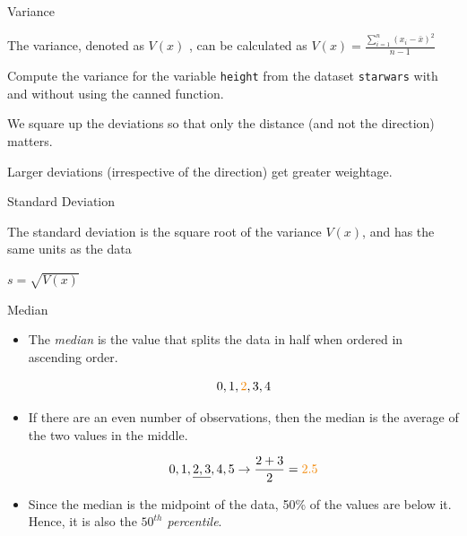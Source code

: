 \documentclass[notes,11pt, aspectratio=169]{beamer}
\newenvironment{wideitemize}{\itemize\addtolength{\itemsep}{10pt}}{\enditemize}
\newcommand{\hl}[1]{\textit{\textcolor{hlblue}{#1}}}
\begin{document}
\begin{frame}{Variance}
\begin{center}
\colorbox{textboxgreen}{
 The variance, denoted as $V(x)$ , can be calculated as 
$ V(x) = \frac{\sum_{i = 1}^n (x_i - \bar{x})^2}{n - 1}$  }

\vspace{5mm}

\pause

\colorbox{textboxred!75}{\parbox{0.75\textwidth}{
Compute the variance for the variable \texttt{height} from the dataset \texttt{starwars} with
 and without using the canned function.}}
\end{center}


\pause
\vspace{8mm}

\begin{wideitemize}
\item We square up the deviations so that only the distance (and not the direction) matters.
\item Larger deviations (irrespective of the direction) get greater weightage. 
\end{wideitemize}
\end{frame}

\begin{frame}{Standard Deviation}

\begin{center}
\colorbox{textboxgreen}{\parbox{0.85\textwidth}{
The standard deviation is the square root of the variance $V(x)$, and has the same units as the data

 \vspace{1mm}
 
 $ s = \sqrt{V(x)}$ }}
\end{center}

\end{frame}


\begin{frame}{Median}

\begin{itemize}

\item The \hl{median} is the value that splits the data in half when ordered in ascending order.

\[ 0,1,\textcolor{tangerine}{2},3,4 \]

\item If there are an even number of observations, then the median is the average of the two values in the middle.

\[ 0,1,\underline{2,3},4,5 \rightarrow \frac{2 + 3}{2} = \textcolor{tangerine}{2.5} \]

\item Since the median is the midpoint of the data, 50\% of the values are below it. Hence, it is also the \hl{$50^{th}$ percentile}.

\end{itemize}

\end{frame}
\end{document}
